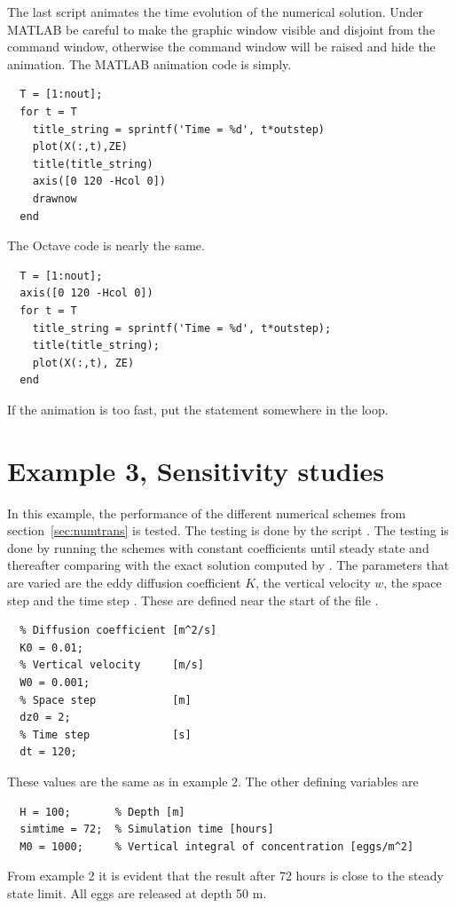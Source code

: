 The last script  animates the time evolution of the
numerical solution. Under MATLAB be careful to make the graphic 
window visible and disjoint from the command window, otherwise
the command window will be raised and hide the animation.
The MATLAB animation code is simply.
\begin{verbatim}
  T = [1:nout]; 
  for t = T 
    title_string = sprintf('Time = %d', t*outstep) 
    plot(X(:,t),ZE) 
    title(title_string) 
    axis([0 120 -Hcol 0]) 
    drawnow 
  end
\end{verbatim}
The Octave code is nearly the same.
\begin{verbatim}
  T = [1:nout]; 
  axis([0 120 -Hcol 0]) 
  for t = T 
    title_string = sprintf('Time = %d', t*outstep); 
    title(title_string); 
    plot(X(:,t), ZE) 
  end
\end{verbatim}
If the animation is too fast, put the statement
 somewhere in the loop.


\section{Example 3, Sensitivity studies}\label{sec:sens}

In this example, the performance of the different numerical schemes
from section~\ref{sec:numtrans} is tested. The testing is done by the
script .  The testing is done by running the schemes
with constant coefficients until steady state and thereafter comparing
with the exact solution computed by . The parameters
that are varied are the eddy diffusion coefficient $K$, the vertical
velocity $w$, the space step  and the time step .
These are defined near the start of the file .
\begin{verbatim}
  % Diffusion coefficient [m^2/s]
  K0 = 0.01;
  % Vertical velocity     [m/s]
  W0 = 0.001;         
  % Space step            [m]
  dz0 = 2;                
  % Time step             [s]
  dt = 120;  
\end{verbatim}
These values are the same as in example 2. 
The other defining variables are
\begin{verbatim}
  H = 100;       % Depth [m]
  simtime = 72;  % Simulation time [hours]
  M0 = 1000;     % Vertical integral of concentration [eggs/m^2]
\end{verbatim}
From example 2 it is evident that the result after 72 hours is close
to the steady state limit.
All eggs are released at depth 50 m.

